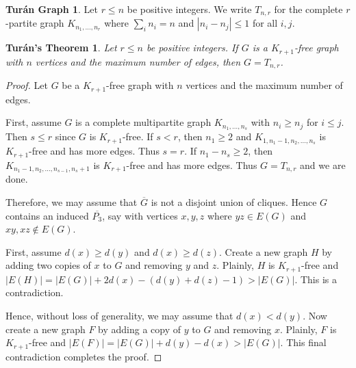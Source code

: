\documentclass[12pt]{amsart}
\theoremstyle{plain}
\newtheorem*{Turan}{Tur{\'a}n's Theorem}
\theoremstyle{definition}
\newtheorem*{TuranGraph}{Tur{\'a}n Graph}
\theoremstyle{remark}
\newcommand{\card}[1]{\left|#1\right|}
\begin{document}
\begin{TuranGraph}
Let $r \leq n$ be positive integers.  We write $T_{n, r}$ for the complete $r$-partite graph $K_{n_1, \ldots, n_r}$ where $\sum_i n_i = n$ and $|n_i - n_j| \leq 1$ for all $i, j$.  
\end{TuranGraph}

\begin{Turan}
Let $r \leq n$ be positive integers.  If $G$ is a $K_{r+1}$-free graph with $n$ vertices and the maximum number of edges, then $G = T_{n, r}$.
\end{Turan}
\begin{proof}
Let $G$ be a $K_{r+1}$-free graph with $n$ vertices and the maximum number of edges.

First, assume $G$ is a complete multipartite graph $K_{n_1, \ldots, n_s}$ with $n_i \geq n_j$ for $i \leq j$.  Then $s \leq r$ since $G$ is $K_{r+1}$-free.  If $s < r$, then $n_1 \geq 2$ and $K_{1, n_1 - 1, n_2, \ldots, n_s}$ is $K_{r+1}$-free and has more edges.  Thus $s = r$.  If $n_1 - n_s \geq 2$, then $K_{n_1 - 1, n_2, \ldots, n_{s-1}, n_s + 1}$ is $K_{r+1}$-free and has more edges.  Thus $G = T_{n, r}$ and we are done.

Therefore, we may assume that $\overline{G}$ is not a disjoint union of cliques. Hence $G$ contains an induced $\overline{P_3}$, say with vertices $x, y, z$ where $yz \in E(G)$ and $xy, xz \not \in E(G)$.

First, assume $d(x) \geq d(y)$ and $d(x) \geq d(z)$.  Create a new graph $H$ by adding two copies of $x$ to $G$ and removing $y$ and $z$.  Plainly, $H$ is $K_{r+1}$-free and $\card{E(H)} = \card{E(G)} + 2d(x) - (d(y) + d(z) - 1) > \card{E(G)}$.  This is a contradiction.

Hence, without loss of generality, we may assume that $d(x) < d(y)$.  Now create a new graph $F$ by adding a copy of $y$ to $G$ and removing $x$.  Plainly, $F$ is $K_{r+1}$-free and $\card{E(F)} = \card{E(G)} + d(y) - d(x) > \card{E(G)}$.  This final contradiction completes the proof.
\end{proof}
\end{document}
